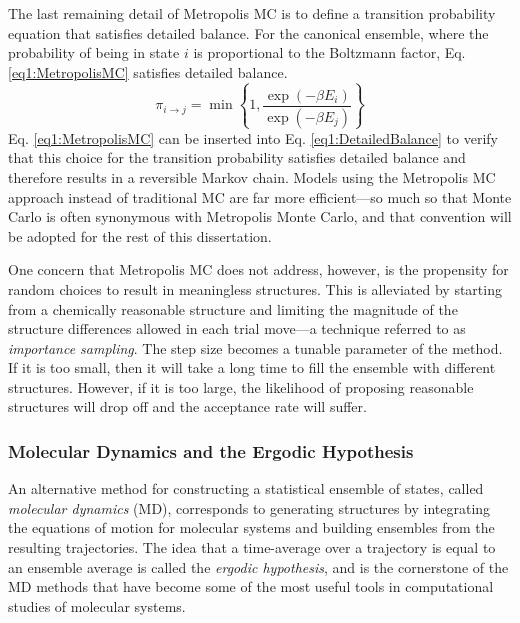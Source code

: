 The last remaining detail of Metropolis MC is to define a transition probability
equation that satisfies detailed balance. For the canonical ensemble, where the
probability of being in state $i$ is proportional to the Boltzmann factor, Eq.
\ref{eq1:MetropolisMC} satisfies detailed balance.
\begin{equation}
   \pi_{i \rightarrow j} = \min \left \lbrace 1, \frac {\exp ( -\beta E _ i )}
                         {\exp ( -\beta E _ j ) } \right \rbrace
   \label{eq1:MetropolisMC}
\end{equation}
Eq. \ref{eq1:MetropolisMC} can be inserted into Eq. \ref{eq1:DetailedBalance} to
verify that this choice for the transition probability satisfies detailed
balance and therefore results in a reversible Markov chain. Models using the
Metropolis MC approach instead of traditional MC are far more efficient---so
much so that Monte Carlo is often synonymous with Metropolis Monte Carlo,
\cite{Tuckerman_Book_StatMech_TheoryAndSim,Leach_Book_MolModel_2001} and that
convention will be adopted for the rest of this dissertation.

One concern that Metropolis MC does not address, however, is the propensity for
random choices to result in meaningless structures. This is alleviated by
starting from a chemically reasonable structure and limiting the magnitude of
the structure differences allowed in each trial move---a technique referred to
as \emph{importance sampling}. The step size becomes a tunable parameter of the
method. If it is too small, then it will take a long time to fill the ensemble
with different structures. However, if it is too large, the likelihood of
proposing reasonable structures will drop off and the acceptance rate will
suffer.

\subsubsection{Molecular Dynamics and the Ergodic Hypothesis}

An alternative method for constructing a statistical ensemble of states, called
\emph{molecular dynamics} (MD), corresponds to generating structures by
integrating the equations of motion for molecular systems and building ensembles
from the resulting trajectories. The idea that a time-average over a trajectory
is equal to an ensemble average is called the \emph{ergodic hypothesis}, and is
the cornerstone of the MD methods that have become some of the most useful tools
in computational studies of molecular systems.

